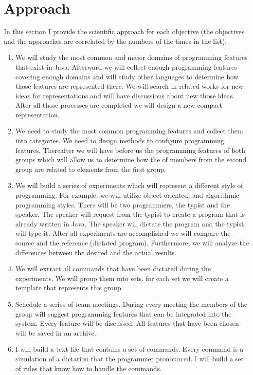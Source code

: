 \section{Approach}
In this section I provide the scientific approach for each objective (the objectives and the approaches are correlated by the numbers of the times in the list):
\begin{enumerate}
	\item We will study the most common and major domains of programming features that exist in Java. Afterward we will collect enough programming features covering enough domains and will study other languages to determine how those features are represented there. We will search in related works for new ideas for representations and will have discussions about new those ideas. After all those processes are completed we will design a new compact representation.
	\item We need to study the most common programming features and collect them into categories. We need to design methods to configure programming features. Thereafter we will have before us the programming features of both groups which will allow us to determine how the of members from the second group are related to  elements from the first group.
	\item We will build a series of experiments which will represent a different style of programming. For example, we will utilize object oriented, and algorithmic programming styles. There will be two programmers, the typist and the speaker. The speaker will request from the typist to create a program that is already written in Java. The speaker will dictate the program and the typist will type it. After all experiments are accomplished we will compare the source and the reference (dictated program). Furthermore, we will analyze the differences between the desired and the actual results.
	\item We will extract all commands that have been dictated during the experiments. We will group them into sets, for each set we will create a template that represents this group.
	\item Schedule a series of team meetings. During every meeting the members of the group will suggest programming features that can be integrated into the system. Every feature will be discussed. All features that have been chosen will be saved in an archive.
	\item I will build a text file that contains a set of commands. Every command is a simulation of a dictation that the programmer pronounced. I will build a set of rules that know how to handle the commands.
\end{enumerate}
